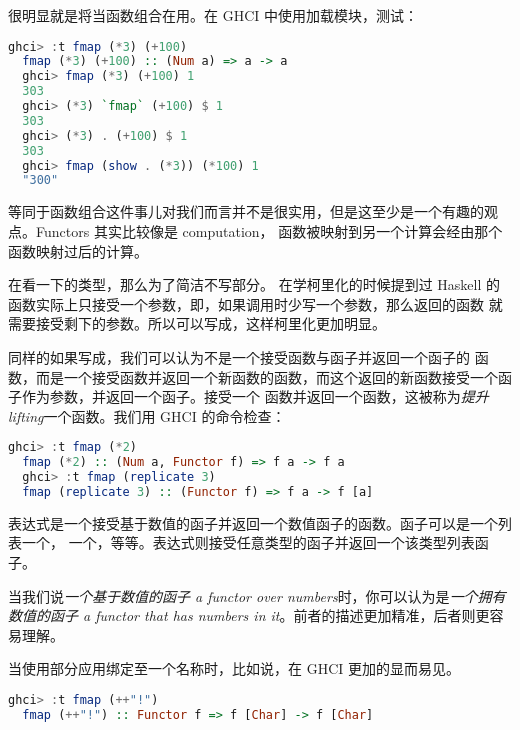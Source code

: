 \documentclass[./main.tex]{subfiles}
\begin{document}
很明显就是将当函数组合在用。在 GHCI 中使用加载模块，测试：

\begin{lstlisting}[language=Haskell]
  ghci> :t fmap (*3) (+100)
  fmap (*3) (+100) :: (Num a) => a -> a
  ghci> fmap (*3) (+100) 1
  303
  ghci> (*3) `fmap` (+100) $ 1
  303
  ghci> (*3) . (+100) $ 1
  303
  ghci> fmap (show . (*3)) (*100) 1
  "300"
\end{lstlisting}

等同于函数组合这件事儿对我们而言并不是很实用，但是这至少是一个有趣的观点。Functors 其实比较像是 computation，
函数被映射到另一个计算会经由那个函数映射过后的计算。

在看一下的类型，那么为了简洁不写部分。
在学柯里化的时候提到过 Haskell 的函数实际上只接受一个参数，即，如果调用时少写一个参数，那么返回的函数
就需要接受剩下的参数。所以可以写成，这样柯里化更加明显。

同样的如果写成，我们可以认为不是一个接受函数与函子并返回一个函子的
函数，而是一个接受函数并返回一个新函数的函数，而这个返回的新函数接受一个函子作为参数，并返回一个函子。接受一个
函数并返回一个函数，这被称为\textit{提升 lifting}一个函数。我们用 GHCI 的命令检查：

\begin{lstlisting}[language=Haskell]
  ghci> :t fmap (*2)
  fmap (*2) :: (Num a, Functor f) => f a -> f a
  ghci> :t fmap (replicate 3)
  fmap (replicate 3) :: (Functor f) => f a -> f [a]
\end{lstlisting}

表达式是一个接受基于数值的函子并返回一个数值函子的函数。函子可以是一个列表一个，
一个，等等。表达式则接受任意类型的函子并返回一个该类型列表函子。

\begin{anote}
  当我们说\textit{一个基于数值的函子 a functor over numbers}时，你可以认为是\textit{一个拥有数值的函子 a functor that
    has numbers in it}。前者的描述更加精准，后者则更容易理解。
\end{anote}

当使用部分应用绑定至一个名称时，比如说，在 GHCI 更加的显而易见。

\begin{lstlisting}[language=Haskell]
  ghci> :t fmap (++"!")
  fmap (++"!") :: Functor f => f [Char] -> f [Char]
\end{lstlisting}
\end{document}
